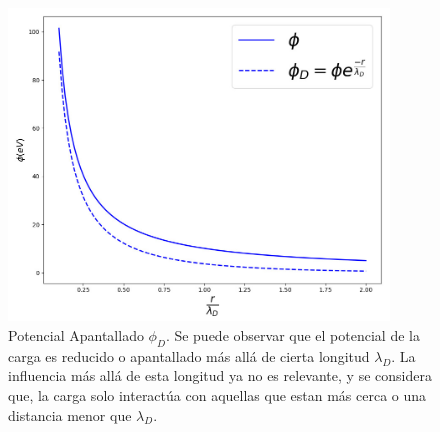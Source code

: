 \documentclass[../main.tex]{subfiles}
\begin{document}
    \begin{figure}[h] 
        \label{fig:apantallamiento}
        \centering
        \includegraphics[width=0.9\textwidth]{Images/Potencial_modificado.jpg}
        \caption{Potencial Apantallado $\phi_D$. Se puede observar que el potencial de la carga es reducido o apantallado más allá de cierta longitud $\lambda_D$. La influencia más allá de esta longitud ya no es relevante, y se considera que, la carga solo interactúa con aquellas que estan más cerca o una distancia menor que $\lambda_D$.}
        \label{fig:apantallamiento}
    \end{figure}
\end{document}
